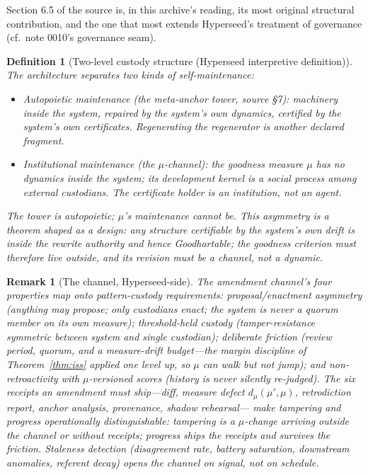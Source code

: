 \documentclass[11pt]{article}
\newtheorem{definition}{Definition}
\newtheorem{remark}{Remark}
\begin{document}
Section 6.5 of the source is, in this archive's reading, its most original structural
contribution, and the one that most extends Hyperseed's treatment of governance (cf.\
note 0010's governance seam).

\begin{definition}[Two-level custody structure (Hyperseed interpretive definition)]\label{def:custody}
The architecture separates two kinds of self-maintenance:
\begin{itemize}
\item \emph{Autopoietic maintenance} (the meta-anchor tower, source \S7): machinery
\emph{inside} the system, repaired by the system's own dynamics, certified by the
system's own certificates. Regenerating the regenerator is another declared fragment.
\item \emph{Institutional maintenance} (the $\mu$-channel): the goodness measure $\mu$
has \emph{no dynamics inside the system}; its development kernel is a social process
among external custodians. The certificate holder is an institution, not an agent.
\end{itemize}
The tower is autopoietic; $\mu$'s maintenance cannot be. This asymmetry is a theorem
shaped as a design: any structure certifiable by the system's own drift is inside the
rewrite authority and hence Goodhartable; the goodness criterion must therefore live
outside, and its revision must be a \emph{channel}, not a dynamic.
\end{definition}

\begin{remark}[The channel, Hyperseed-side]
The amendment channel's four properties map onto pattern-custody requirements:
\emph{proposal/enactment asymmetry} (anything may propose; only custodians enact; the
system is never a quorum member on its own measure); \emph{threshold-held custody}
(tamper-resistance symmetric between system and single custodian); \emph{deliberate
friction} (review period, quorum, and a \emph{measure-drift budget}---the margin
discipline of Theorem~\ref{thm:iss} applied one level up, so $\mu$ can walk but not
jump); and \emph{non-retroactivity with $\mu$-versioned scores} (history is never
silently re-judged). The six receipts an amendment must ship---diff, measure defect
$d_\mu(\mu',\mu)$, retrodiction report, anchor analysis, provenance, shadow rehearsal---
make tampering and progress \emph{operationally distinguishable}: tampering is a
$\mu$-change arriving outside the channel or without receipts; progress ships the
receipts and survives the friction. Staleness detection (disagreement rate, battery
saturation, downstream anomalies, referent decay) opens the channel on signal, not on
schedule.
\end{remark}
\end{document}

